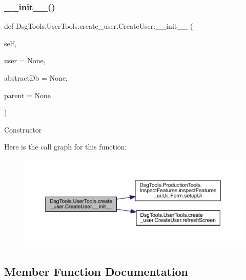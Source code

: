\subsubsection{\texorpdfstring{\+\_\+\+\_\+init\+\_\+\+\_\+()}{\_\_init\_\_()}}
{\footnotesize\ttfamily def Dsg\+Tools.\+User\+Tools.\+create\+\_\+user.\+Create\+User.\+\_\+\+\_\+init\+\_\+\+\_\+ (\begin{DoxyParamCaption}\item[{}]{self,  }\item[{}]{user = {\ttfamily None},  }\item[{}]{abstract\+Db = {\ttfamily None},  }\item[{}]{parent = {\ttfamily None} }\end{DoxyParamCaption})}

\begin{DoxyVerb}Constructor
\end{DoxyVerb}
 Here is the call graph for this function\+:
\nopagebreak
\begin{figure}[H]
\begin{center}
\leavevmode
\includegraphics[width=350pt]{class_dsg_tools_1_1_user_tools_1_1create__user_1_1_create_user_a1950fa38682fc37cb8a34e9ba9095822_cgraph}
\end{center}
\end{figure}


\subsection{Member Function Documentation}
\mbox{\label{class_dsg_tools_1_1_user_tools_1_1create__user_1_1_create_user_aec7f0b7fca0fab38d46ee9c4adce153f}} 
